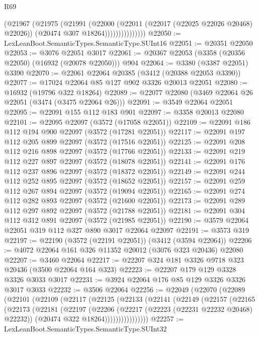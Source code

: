\begin{lexlean}{R69}
\begin{coremodule}
                        (@21967
                          (@21975
                            (@21991
                              (@22000
                                (@22011 (@22017 (@22025 @22026 @20468) @22026))
                                (@20474 @307 @18264)))))))))))))))
@22050 := LexLeanBoot.SemanticTypes.SemanticType.SUInt16
@22051 := @20351 @22050
@22053 := @3076 @22051 @3017
@22061 := @20367 @22053 (@3358 (@20356 @22050) (@16932 (@20078 @22050))) @904
@22064 := @3380 (@3387 @22051) @3390
@22070 := @22061 @22064 @20385 (@3412 (@20388 @22053 @3390))
@22077 := @17024 @22064 @85 @127 @902 @3326 @20013 @22051
@22080 := @16932 (@19796 @322 @18264)
@22089 := @22077 @22080 (@3469 @22064 @26 @22051 (@3474 (@3475 @22064 @26)))
@22091 := @3549 @22064 @22051
@22095 := @22091 @155 @112 @183 @901
@22097 := @3358 @20013 @22080
@22101 := @22095 @22097 (@3572 (@17058 @22051))
@22109 := @22091 @186 @112 @194 @900 @22097 (@3572 (@17281 @22051))
@22117 := @22091 @197 @112 @205 @899 @22097 (@3572 (@17516 @22051))
@22125 := @22091 @208 @112 @216 @898 @22097 (@3572 (@17766 @22051))
@22133 := @22091 @219 @112 @227 @897 @22097 (@3572 (@18078 @22051))
@22141 := @22091 @176 @112 @237 @896 @22097 (@3572 (@18372 @22051))
@22149 := @22091 @244 @112 @252 @895 @22097 (@3572 (@18652 @22051))
@22157 := @22091 @259 @112 @267 @894 @22097 (@3572 (@19094 @22051))
@22165 := @22091 @274 @112 @282 @893 @22097 (@3572 (@21600 @22051))
@22173 := @22091 @289 @112 @297 @892 @22097 (@3572 (@21788 @22051))
@22181 := @22091 @304 @112 @312 @891 @22097 (@3572 (@21985 @22051))
@22190 := @3579 @22064 @22051 @319 @112 @327 @890 @3017 @22064 @22097
@22191 := @3573 @319
@22197 := @22190 (@3572 (@22191 @22051)) (@3412 (@3594 @22064))
@22206 := @4072 @22064 @161 @326 @11352 @20012 (@3076 @323 @20436) @22080
@22207 := @3460 @22064
@22217 := @22207 @324 @181 @3326 @9718 @323 @20436 (@3500 @22064 @164 @323)
@22223 := @22207 @179 @129 @3328 @3326 @3033 @3017
@22231 := @3924 @22064 @176 @85 @129 @3326 @3326 @3017 @3033
@22232 := @3506 @22064
@22256 := @22049
    (@22070
      (@22089
        (@22101
          (@22109
            (@22117
              (@22125
                (@22133
                  (@22141
                    (@22149
                      (@22157
                        (@22165
                          (@22173
                            (@22181
                              (@22197
                                (@22206
                                  (@22217 (@22223 (@22231 @22232 @20468) @22232))
                                  (@20474 @322 @18264))))))))))))))))
@22257 := LexLeanBoot.SemanticTypes.SemanticType.SUInt32

\end{coremodule}
\end{lexlean}
